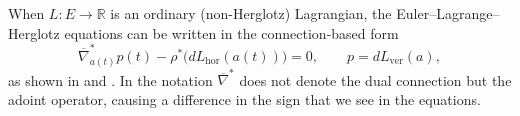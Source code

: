 \documentclass[11pt,a4paper]{article}
\theoremstyle{definition}
\begin{document}
When $L\colon E\to\mathbb{R}$ is an ordinary (non-Herglotz) Lagrangian, 
the Euler--Lagrange--Herglotz equations can be written in the 
connection-based form
\begin{equation}\label{eq:ELP_classical}
\overline{\nabla}^*_{a(t)}p(t)
-
\rho^*\!\big(dL_{\mathrm{hor}}(a(t))\big)
=0,
\qquad
p=dL_{\mathrm{ver}}(a),
\end{equation}
as shown in \cite[Section~3]{li2017lagrangian} and 
\cite[Theorem~5.3]{hu2024hamiltonian}. In \cite{li2017lagrangian} the notation $\overline{\nabla}^*$ does not denote the dual connection but the adoint operator, causing a difference in the sign that we see in the equations.






\end{document}
